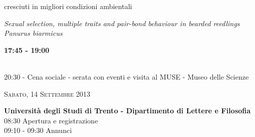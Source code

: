 \documentclass[10pt,twoside,openright,x11names,svgnames,italian,a4paper,dvipsnames,table]{memoir}
\begin{document}
{\begin{description}[leftmargin=1cm,labelindent=1cm]
{cresciuti in migliori condizioni ambientali}
	\item[17:25 - M. Griggio] \emph{Sexual selection, multiple traits and pair-bond behaviour in bearded
reedlings \emph{Panurus biarmicus}}
\end{description}
{\color{MUSEBLUE}{\hrule height 2pt}}
\vspace{1cm}
{\bfseries 17:45 - 19:00}
\begin{description}[leftmargin=1cm,labelindent=1cm,style=unboxed]\itemsep0pt
	\item[\bfseries  \raggedright Sessione poster]
	\item[Assemblea CISO]
\end{description}
{\color{MUSEBLUE}{\hrule height 2pt}}
\vspace{.5cm}\\
20:30 - Cena sociale - serata con eventi e visita al MUSE - Museo delle Scienze \\
\vspace{.5cm}

\noindent\textcolor{MUSEBLUE}{\textsc{\LARGE Sabato, 14 Settembre 2013}} \\
\vspace{.2cm}

{\bfseries Universit\`a degli Studi di Trento - Dipartimento di Lettere e Filosofia}\\
08:30 Apertura e registrazione \\
09:10 - 09:30 Annunci \\
\vspace{.2cm}

}
\end{document}
